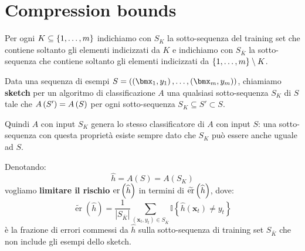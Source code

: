 \documentclass[\main/main.tex]{subfiles}
\begin{document}
\chapter{Compression bounds}
\begin{definition}
    Per ogni \(K \subseteq \left\{1, \ldots, m\right\}\) indichiamo con \(S_K\) la sotto-sequenza del training set che contiene soltanto gli elementi indicizzati da \(K\) e indichiamo con \(S_{\bar{K}}\) la sotto-sequenza che contiene soltanto gli elementi indicizzati da \(\left\{1, \ldots, m\right\} \setminus K\).
\end{definition}
\begin{definition}[Sketch]
    Data una sequenza di esempi \(S = \rnd{\examples{m}}\), chiamiamo \textbf{sketch} per un algoritmo di classificazione \(A\) una qualsiasi sotto-sequenza \(S_K\) di \(S\) tale che \(A\left(S'\right) = A\left(S\right)\) per ogni sotto-sequenza \(S_K \subseteq S' \subset S\).
    
    Quindi \(A\) con input \(S_K\) genera lo stesso classificatore di \(A\) con input \(S\): una sotto-sequenza con questa proprietà esiste sempre dato che \(S_K\) può essere anche uguale ad \(S\). 
\end{definition}
\begin{goal}
    Denotando:
    \[
        \widehat{h}=A(S)=A\left(S_{K}\right)
    \]
    vogliamo \textbf{limitare il rischio} \(\text{er}\left(\widehat{h}\right)\) in termini di \(\widetilde{\text{er}}\left(\widehat{h}\right)\), dove:
    \[
        \widetilde{\operatorname{er}}(\widehat{h})=\frac{1}{\left|S_{\overline{K}}\right|} \sum_{\left(\boldsymbol{x}_{t}, y_{t}\right) \in S_{\overline{K}}} \mathbb{I}\left\{\widehat{h}\left(\boldsymbol{x}_{t}\right) \neq y_{t}\right\}
    \]
    è la frazione di errori commessi da \(\hat{h}\) sulla sotto-sequenza di training set \(S_{\bar{K}}\) che non include gli esempi dello sketch.
\end{goal}
\end{document}
